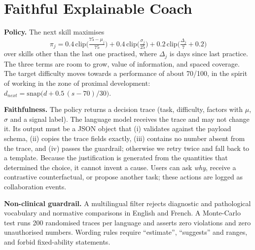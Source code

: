 \documentclass[conference]{IEEEtran}
\begin{document}
\section{Faithful Explainable Coach}\label{sec:coach}
\textbf{Policy.} The next skill maximises
\begin{equation}
\pi_j=0.4\,\mathrm{clip}\!\big(\tfrac{75-\mu_j}{75}\big)+0.4\,\mathrm{clip}\!\big(\tfrac{\sigma_j}{25}\big)+0.2\,\mathrm{clip}\!\big(\tfrac{\Delta_j}{7}+0.2\big)
\end{equation}
over skills other than the last one practised, where $\Delta_j$ is days since last practice. The three terms are room to grow, value of information, and spaced coverage. The target difficulty moves towards a performance of about 70/100, in the spirit of working in the zone of proximal development: $d_{next}=\mathrm{snap}\big(d+0.5\,(s-70)/30\big)$.

\textbf{Faithfulness.} The policy returns a decision trace (task, difficulty, factors with $\mu$, $\sigma$ and a signal label). The language model receives the trace and may not change it. Its output must be a JSON object that (i) validates against the payload schema, (ii) copies the trace fields exactly, (iii) contains no number absent from the trace, and (iv) passes the guardrail; otherwise we retry twice and fall back to a template. Because the justification is generated from the quantities that determined the choice, it cannot invent a cause. Users can ask \emph{why}, receive a contrastive counterfactual, or propose another task; these actions are logged as collaboration events.

\textbf{Non-clinical guardrail.} A multilingual filter rejects diagnostic and pathological vocabulary and normative comparisons in English and French. A Monte-Carlo test runs 200 randomised traces per language and asserts zero violations and zero unauthorised numbers. Wording rules require ``estimate'', ``suggests'' and ranges, and forbid fixed-ability statements.
\end{document}
